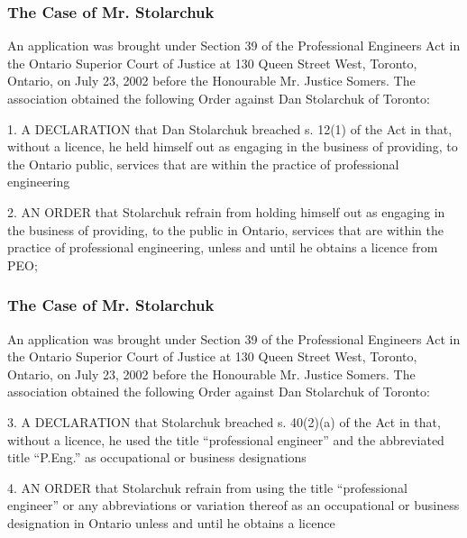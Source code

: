 \begin{frame}
\frametitle{The Case of Mr. Stolarchuk}

An application was brought under Section 39 of the Professional Engineers Act in the Ontario Superior Court of Justice at 130 Queen Street West, Toronto, Ontario, on July 23, 2002 before the Honourable Mr. Justice Somers.  The association obtained the following Order against Dan Stolarchuk of Toronto:

1. A DECLARATION that Dan Stolarchuk breached s. 12(1) of the Act in that, without a licence, he held himself out as engaging in the business of providing, to the Ontario public, services that are within the practice of professional engineering

2. AN ORDER that Stolarchuk refrain from holding himself out as engaging in the business of providing, to the public in Ontario, services that are within the practice of professional engineering, unless and until he obtains a licence from PEO;


\end{frame}

\begin{frame}
\frametitle{The Case of Mr. Stolarchuk}

An application was brought under Section 39 of the Professional Engineers Act in the Ontario Superior Court of Justice at 130 Queen Street West, Toronto, Ontario, on July 23, 2002 before the Honourable Mr. Justice Somers.  The association obtained the following Order against Dan Stolarchuk of Toronto:

3. A DECLARATION that Stolarchuk breached s. 40(2)(a) of the Act in that, without a licence, he used the title ``professional engineer'' and the abbreviated title ``P.Eng.'' as occupational or business designations

4. AN ORDER that Stolarchuk refrain from using the title ``professional  engineer'' or any abbreviations or variation thereof as an occupational or  business designation in Ontario unless and until he obtains a licence

\end{frame}



